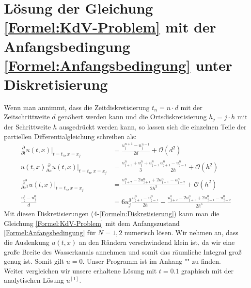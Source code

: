 \documentclass[ngerman]{scrartcl}
\begin{document}

\section{Lösung der Gleichung \ref{Formel:KdV-Problem} mit der Anfangsbedingung \ref{Formel:Anfangsbedingung} unter Diskretisierung}
Wenn man annimmt, dass die Zeitdiskretisierung $t_n = n \cdot d$ mit der Zeitschrittweite $d$ genähert werden kann und die Ortsdiskretisierung $h_j = j \cdot h$ mit der Schrittweite $h$ ausgedrückt werden kann, so lassen sich die einzelnen Teile der partiellen Differentialgleichung schreiben als:
\begin{align}
\frac{\partial}{\partial t}u(t,x) \bigg|_{t=t_n, x=x_j} &=\frac{u_j^{n+1}-n_j^{n-1}}{2d} + \mathcal O(d^2) \\
u(t,x) \frac{\partial}{\partial x}u(t,x) \bigg|_{t=t_n, x=x_j} &=\frac{u_{j+1}^n + u_j^n + u_{j-1}^n}{3} \frac{u_{j+1}^n - u_{j-1}^n}{2h} + \mathcal O(h^2) \\
\frac{\partial^3}{\partial x^3}u(t,x) \bigg|_{t=t_n, x=x_j} &=\frac{u_{j+2}^n - 2 u_{j+1}^n + 2 u_{j-1}^n - u_{j-2}^n}{2h^3} + \mathcal O(h^2) \\
\frac{u_j^1 - u_j^0}{d} &= 6u_j^0 \frac{u_{j+1}^0 - u_{j-1}^0}{2h} - \frac{u_{j+2}^0 - 2u_{j+1}^0 + 2u_{j-1}^0 - u_{j-2}^0}{2h^3}
\label{Formeln:Diskretisierung}
\end{align}
Mit diesen Diskretisierungen (4-\ref{Formeln:Diskretisierung}) kann man die Gleichung \ref{Formel:KdV-Problem} mit dem Anfangszustand \ref{Formel:Anfangsbedingung} für $N=1,2$ numerisch lösen. Wir nehmen an, dass die Auslenkung $u(t,x)$ an den Rändern verschwindend klein ist, da wir eine große Breite des Wasserkanals annehmen und somit das räumliche Integral groß genug ist. Somit gilt $u=0$. Unser Programm ist im Anhang "" zu finden. \\
Weiter vergleichen wir unsere erhaltene Lösung mit $t=0.1$ graphisch mit der analytischen Lösung $u^{[1]}$. 
% 
\end{document}
